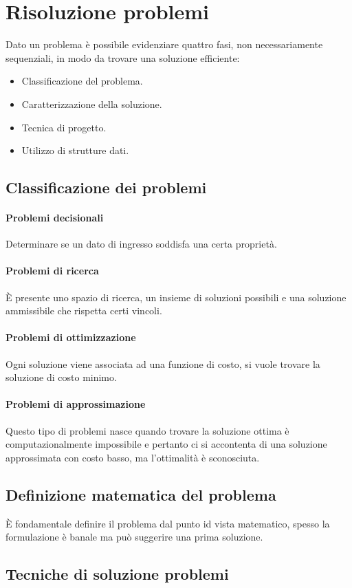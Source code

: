 \chapter{Risoluzione problemi}
Dato un problema \`e possibile evidenziare quattro fasi, non necessariamente sequenziali, in modo da trovare una soluzione efficiente:
\begin{itemize}
\item Classificazione del problema.
\item Caratterizzazione della soluzione.
\item Tecnica di progetto.
\item Utilizzo di strutture dati.
\end{itemize}
\section{Classificazione dei problemi}
\subsubsection{Problemi decisionali}
Determinare se un dato di ingresso soddisfa una certa propriet\`a.
\subsubsection{Problemi di ricerca}
\`E presente uno spazio di ricerca, un insieme di soluzioni possibili e una soluzione ammissibile  che rispetta certi vincoli.
\subsubsection{Problemi di ottimizzazione}
Ogni soluzione viene associata ad una funzione di costo, si vuole trovare la soluzione di costo minimo.
\subsubsection{Problemi di approssimazione}
Questo tipo di problemi nasce quando trovare la soluzione ottima \`e computazionalmente impossibile e pertanto ci si accontenta di una soluzione approssimata con costo basso, ma l'ottimalit\`a \`e sconosciuta.
\section{Definizione matematica del problema}
\`E fondamentale definire il problema dal punto id vista matematico, spesso la formulazione \`e banale ma pu\`o suggerire una prima soluzione. 
\section{Tecniche di soluzione problemi}
